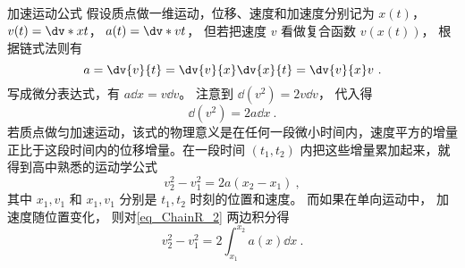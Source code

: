 \begin{example}{加速运动公式}\label{ex_ChainR_3}
假设质点做一维运动，位移、速度和加速度分别记为 $x(t)$，  $v(t) = \dv*{x}{t}$，  $a(t) = \dv*{v}{t}$， 但若把速度 $v$ 看做复合函数 $v(x(t))$， 根据链式法则有
\begin{equation}
a = \dv{v}{t} = \dv{v}{x}\dv{x}{t} = \dv{v}{x}v~.
\end{equation}
写成微分表达式，有 $a\dd{x} = v\dd{v}$。 注意到 $\dd (v^2) = 2v\dd{v}$， 代入得
\begin{equation}\label{eq_ChainR_2}
\dd(v^2) = 2a \dd{x}~.
\end{equation}
若质点做匀加速运动，该式的物理意义是在任何一段微小时间内，速度平方的增量正比于这段时间内的位移增量。在一段时间 $(t_1,t_2)$ 内把这些增量累加起来，就得到高中熟悉的运动学公式
\begin{equation}
v_2^2-v_1^2 = 2a(x_2-x_1)~,
\end{equation}
其中 $x_1,v_1$ 和 $x_1,v_1$ 分别是 $t_1,t_2$ 时刻的位置和速度。 而如果在单向运动中， 加速度随位置变化， 则对\autoref{eq_ChainR_2} 两边积分得
\begin{equation}
v_2^2 - v_1^2 = 2\int_{x_1}^{x_2}a(x)\dd{x}~.
\end{equation}
\end{example}
